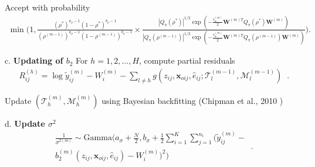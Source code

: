 \documentclass[aoas]{imsart}
\theoremstyle{plain}
\theoremstyle{definition}
\begin{document}
\begin{enumerate}
      Accept with probability
      \begin{equation}
\begin{split}
\min\biggl(1, \frac{(\rho^*)^{a_\rho - 1}(1-\rho^*)^{b_\rho - 1}}{(\rho^{(m-1)})^{a_\rho - 1}(1-\rho^{(m-1)})^{b_\rho - 1}} \times \frac{|Q_\pi(\rho^*)|^{1/2}\exp\left(-\frac{\tau_w^{(m)}}{2}\mathbf{W}^{(m)T}Q_\pi(\rho^*)\mathbf{W}^{(m)}\right)}{|Q_\pi(\rho^{(m-1)})|^{1/2}\exp\left(-\frac{\tau_w^{(m)}}{2}\mathbf{W}^{(m)T}Q_\pi(\rho^{(m-1)})\mathbf{W}^{(m)}\right)}\biggr). \nonumber
\end{split}
\hspace{2pt}
\end{equation}
   
 \noindent  c. \textbf{Updating of $b_2$}
For $h = 1, 2, ..., H$, compute partial residuals
      \begin{equation}
      \begin{split} 
      R_{ij}^{(h)} = \log \tilde{y}_{ij}^{(m)} - W_i^{(m)} - \sum_{l \neq h} g(z_{ij}, \mathbf{x}_{oij}, \hat{e}_{ij}; \mathcal{T}_l^{(m-1)}, \mathcal{M}_l^{(m-1)}) \nonumber
      \end{split}
      \hspace{2pt}. \end{equation}
      
      Update $(\mathcal{T}_h^{(m)}, \mathcal{M}_h^{(m)})$ using Bayesian backfitting (Chipman et al., 2010 \parencite{Chipman10})
   
\noindent d. \textbf{Update $\sigma^2$}
      \begin{equation}
      \begin{split}
      \frac{1}{\sigma^{2(m)}} \sim \text{Gamma}\biggl(a_\sigma + \frac{N}{2}, b_\sigma + \frac{1}{2}\sum_{i=1}^K\sum_{j=1}^{n_i}(\tilde{y}_{ij}^{(m)} - \\
      b_2^{(m)}(z_{ij}, \mathbf{x}_{oij}, \hat{e}_{ij}) - W_i^{(m)})^2\biggr) \nonumber
      \end{split}
      \hspace{2pt}. \end{equation}
\end{enumerate}
\end{document}
